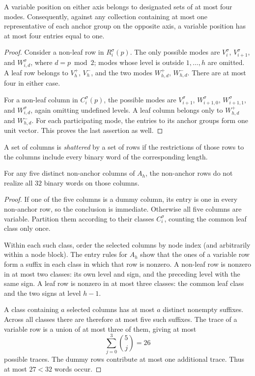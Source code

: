 \begin{lemma}
\label{lem:mode-incidences}
A variable position on either axis belongs to designated sets of at
most four modes. Consequently, against any collection containing at
most one representative of each anchor group on the opposite axis,
a variable position has at most four entries equal to one.
\end{lemma}

\begin{proof}
Consider a non-leaf row in $R_i^\sigma(p)$. The only possible modes
are $V_i^\sigma$, $V_{i+1}^\sigma$, and $W_{i,d}^\sigma$, where
$d=p\bmod2$; modes whose level is outside $1,\ldots,h$ are omitted.
A leaf row belongs to $V_h^+$, $V_h^-$, and the two modes
$W_{h,d}^+$, $W_{h,d}^-$. There are at most four in either case.

For a non-leaf column in $C_i^\sigma(p)$, the possible modes are
$V_{i+1}^\sigma$, $W_{i+1,0}^\sigma$,
$W_{i+1,1}^\sigma$, and $W_{i,d}^\sigma$, again omitting undefined
levels. A leaf column belongs only to $W_{h,d}^+$ and $W_{h,d}^-$.
For each participating mode, the entries to its anchor groups form
one unit vector. This proves the last assertion as well.
\end{proof}

A set of columns is \emph{shattered} by a set of rows if the
restrictions of those rows to the columns include every binary word
of the corresponding length.

\begin{lemma}
\label{lem:nonanchor-traces}
For any five distinct non-anchor columns of $A_h$, the non-anchor
rows do not realize all $32$ binary words on those columns.
\end{lemma}

\begin{proof}
If one of the five columns is a dummy column, its entry is one in
every non-anchor row, so the conclusion is immediate. Otherwise all
five columns are variable. Partition them according to their classes
$C_i^\sigma$, counting the common leaf class only once.

Within each such class, order the selected columns by node index
(and arbitrarily within a node block). The entry rules for $A_h$
show that the ones of a variable row form a suffix in each class in
which that row is nonzero. A non-leaf row is nonzero in at most two
classes: its own level and sign, and the preceding level with the
same sign. A leaf row is nonzero in at most three classes: the common
leaf class and the two signs at level $h-1$.

A class containing $a$ selected columns has at most $a$ distinct
nonempty suffixes. Across all classes there are therefore at most
five such suffixes. The trace of a variable row is a union of at most
three of them, giving at most
\[
   \sum_{j=0}^3\binom{5}{j}=26
\]
possible traces. The dummy rows contribute at most one additional
trace. Thus at most $27<32$ words occur.
\end{proof}


